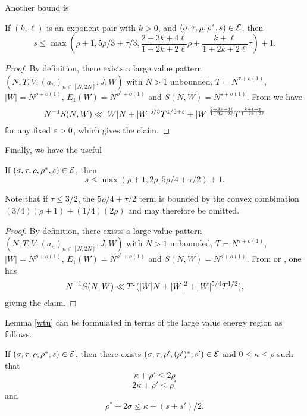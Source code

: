 Another bound is

\begin{lemma}\label{double-zeta_from_exp_pair}\cite[Lemma 11.2]{ivic}  If $(k,\ell)$ is an exponent pair with $k>0$, and $(\sigma,\tau,\rho,\rho^*,s) \in \mathcal{E}$, then
$$ s \leq \max\left( \rho+1, 5\rho/3 + \tau/3, \frac{2+3k+4\ell}{1+2k+2\ell} \rho + \frac{k+\ell}{1+2k+2\ell} \tau\right) + 1.$$
\end{lemma}

\begin{proof} By definition, there exists a large value pattern $(N,T,V,(a_n)_{n \in [N,2N]},J,W)$ with $N>1$ unbounded, $T = N^{\tau+o(1)}$, $|W| = N^{\rho+o(1)}$, $E_1(W) = N^{\rho^*+o(1)}$ and $S(N,W) = N^{s+o(1)}$.   From \cite[Lemma 11.2]{ivic} we have
$$ N^{-1} S(N,W) \ll |W| N + |W|^{5/3} T^{1/3+\varepsilon} + |W|^{\frac{2+3k+4\ell}{1+2k+2\ell}} T^{\frac{k+\ell+\varepsilon}{1+2k+2\ell}}$$
for any fixed $\varepsilon>0$, which gives the claim.
\end{proof}


Finally, we have the useful

\begin{lemma}\label{hb-double}  If $(\sigma,\tau,\rho,\rho^*,s) \in \mathcal{E}$, then
    $$ s \leq \max( \rho+1, 2\rho, 5\rho/4+\tau/2) + 1.$$
\end{lemma}

Note that if $\tau \leq 3/2$, the $5\rho/4+\tau/2$ term is bounded by the convex combination $(3/4)(\rho+1)+(1/4)(2\rho)$ and may therefore be omitted.

\literature
{}

\begin{proof} By definition, there exists a large value pattern $(N,T,V,(a_n)_{n \in [N,2N]},J,W)$ with $N>1$ unbounded, $T = N^{\tau+o(1)}$, $|W| = N^{\rho+o(1)}$, $E_1(W) = N^{\rho^*+o(1)}$ and $S(N,W) = N^{s+o(1)}$.   From \cite[Theorem 1]{heathbrown_large_1979} or \cite[Lemma 11.5]{ivic}, one has
$$ N^{-1} S(N,W) \ll T^\varepsilon ( |W| N + |W|^2 + |W|^{5/4} T^{1/2} ),$$
giving the claim.
\end{proof}

Lemma \ref{wtu} can be formulated in terms of the large value energy region as follows.

\begin{lemma}\label{wtu-alt}  If $(\sigma,\tau,\rho,\rho^*,s) \in \mathcal{E}$, then there exists $(\sigma,\tau,\rho',(\rho')^*,s') \in \mathcal{E}$ and $0 \leq \kappa \leq \rho$ such that
$$ \kappa + \rho' \leq 2 \rho$$
$$ 2\kappa + \rho' \leq \rho^*$$
and
$$ \rho^* + 2\sigma \leq \kappa + (s+s')/2.$$
\end{lemma}


